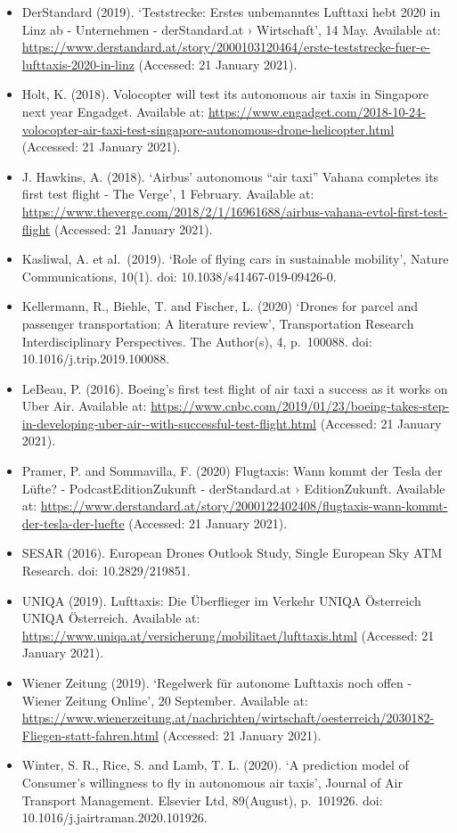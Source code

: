 \documentclass[
]{book}
\providecommand{\tightlist}{%
  \setlength{\itemsep}{0pt}\setlength{\parskip}{0pt}}
\begin{document}
\begin{itemize}
\tightlist
\item
  DerStandard (2019). `Teststrecke: Erstes unbemanntes Lufttaxi hebt 2020 in Linz ab - Unternehmen - derStandard.at › Wirtschaft', 14 May. Available at: \url{https://www.derstandard.at/story/2000103120464/erste-teststrecke-fuer-e-lufttaxis-2020-in-linz} (Accessed: 21 January 2021).
\item
  Holt, K. (2018). Volocopter will test its autonomous air taxis in Singapore next year \textbar{} Engadget. Available at: \url{https://www.engadget.com/2018-10-24-volocopter-air-taxi-test-singapore-autonomous-drone-helicopter.html} (Accessed: 21 January 2021).
\item
  J. Hawkins, A. (2018). `Airbus' autonomous ``air taxi'' Vahana completes its first test flight - The Verge', 1 February. Available at: \url{https://www.theverge.com/2018/2/1/16961688/airbus-vahana-evtol-first-test-flight} (Accessed: 21 January 2021).
\item
  Kasliwal, A. et al.~(2019). `Role of flying cars in sustainable mobility', Nature Communications, 10(1). doi: 10.1038/s41467-019-09426-0.
\item
  Kellermann, R., Biehle, T. and Fischer, L. (2020) `Drones for parcel and passenger transportation: A literature review', Transportation Research Interdisciplinary Perspectives. The Author(s), 4, p.~100088. doi: 10.1016/j.trip.2019.100088.
\item
  LeBeau, P. (2016). Boeing's first test flight of air taxi a success as it works on Uber Air. Available at: \url{https://www.cnbc.com/2019/01/23/boeing-takes-step-in-developing-uber-air--with-successful-test-flight.html} (Accessed: 21 January 2021).
\item
  Pramer, P. and Sommavilla, F. (2020) Flugtaxis: Wann kommt der Tesla der Lüfte? - PodcastEditionZukunft - derStandard.at › EditionZukunft. Available at: \url{https://www.derstandard.at/story/2000122402408/flugtaxis-wann-kommt-der-tesla-der-luefte} (Accessed: 21 January 2021).
\item
  SESAR (2016). European Drones Outlook Study, Single European Sky ATM Research. doi: 10.2829/219851.
\item
  UNIQA (2019). Lufttaxis: Die Überflieger im Verkehr \textbar{} UNIQA Österreich \textbar{} UNIQA Österreich. Available at: \url{https://www.uniqa.at/versicherung/mobilitaet/lufttaxis.html} (Accessed: 21 January 2021).
\item
  Wiener Zeitung (2019). `Regelwerk für autonome Lufttaxis noch offen - Wiener Zeitung Online', 20 September. Available at: \url{https://www.wienerzeitung.at/nachrichten/wirtschaft/oesterreich/2030182-Fliegen-statt-fahren.html} (Accessed: 21 January 2021).
\item
  Winter, S. R., Rice, S. and Lamb, T. L. (2020). `A prediction model of Consumer's willingness to fly in autonomous air taxis', Journal of Air Transport Management. Elsevier Ltd, 89(August), p.~101926. doi: 10.1016/j.jairtraman.2020.101926.
\end{itemize}
\end{document}
